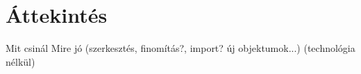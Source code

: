 \chapter{Áttekintés}
Mit csinál
Mire jó (szerkesztés, finomítás?, import? új objektumok...)
(technológia nélkül)